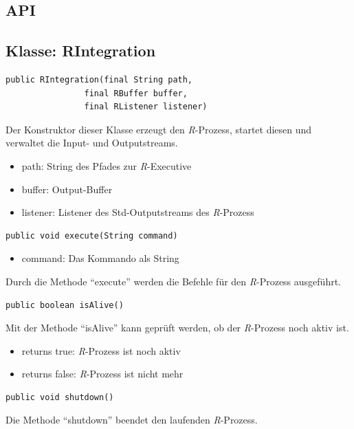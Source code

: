 \documentclass[a4paper, 12pt]{report} %
\begin{document}
\subsection{API} \label{API}

\subsection{Klasse: RIntegration}

\lstset{language=Java}
\begin{lstlisting}[frame=single]
public RIntegration(final String path, 
	            final RBuffer buffer,
	            final RListener listener)	
\end{lstlisting}
%
Der Konstruktor dieser Klasse erzeugt den \textit{R}-Prozess, startet diesen und verwaltet die Input- und Outputstreams.
\begin{itemize}
	\item path: String des Pfades zur \textit{R}-Executive
	\item buffer: Output-Buffer
	\item listener: Listener des Std-Outputstreams des \textit{R}-Prozess
\end{itemize}

\lstset{language=Java}
\begin{lstlisting}[frame=single]
public void execute(String command)
\end{lstlisting}
\begin{itemize}
	\item command: Das Kommando als String
\end{itemize}

Durch die Methode "`execute"' werden die Befehle für den \textit{R}-Prozess ausgeführt.
%
\lstset{language=Java}
\begin{lstlisting}[frame=single]
public boolean isAlive()
\end{lstlisting}
%
Mit der Methode "`isAlive"'  kann geprüft werden, ob der \textit{R}-Prozess noch aktiv ist.
\begin{itemize}
	\item returns true: \textit{R}-Prozess ist noch aktiv
	\item returns false: \textit{R}-Prozess ist nicht mehr 
\end{itemize}


\lstset{language=Java}
\begin{lstlisting}[frame=single]
public void shutdown()
\end{lstlisting}
%
Die Methode "`shutdown"' beendet den laufenden \textit{R}-Prozess.\\
\end{document}
